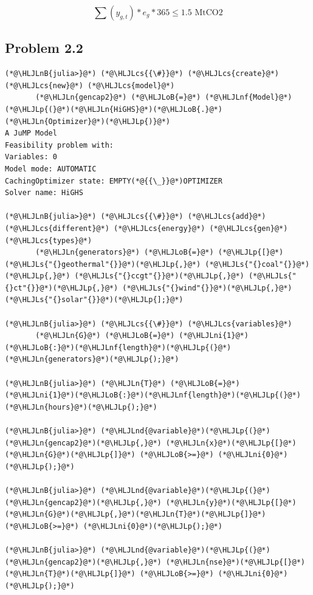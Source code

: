 \documentclass[12pt,a4paper]{article}
\newcommand{\HLJLn}[1]{#1}
\newcommand{\HLJLnd}[1]{\textcolor[RGB]{214,102,97}{#1}}
\newcommand{\HLJLnf}[1]{\textcolor[RGB]{66,102,213}{#1}}
\newcommand{\HLJLs}[1]{\textcolor[RGB]{201,61,57}{#1}}
\newcommand{\HLJLnB}[1]{\textcolor[RGB]{59,151,46}{#1}}
\newcommand{\HLJLni}[1]{\textcolor[RGB]{59,151,46}{#1}}
\newcommand{\HLJLoB}[1]{\textcolor[RGB]{102,102,102}{\textbf{#1}}}
\newcommand{\HLJLp}[1]{#1}
\newcommand{\HLJLcs}[1]{\textcolor[RGB]{153,153,119}{\textit{#1}}}
\begin{document}
\[

\sum (y_{g,t}) * e_g * 365 \leq 1.5 \text{ MtCO2}

\]
\subsection{Problem 2.2}

\begin{lstlisting}
(*@\HLJLnB{julia>}@*) (*@\HLJLcs{{\#}}@*) (*@\HLJLcs{create}@*) (*@\HLJLcs{new}@*) (*@\HLJLcs{model}@*)
       (*@\HLJLn{gencap2}@*) (*@\HLJLoB{=}@*) (*@\HLJLnf{Model}@*)(*@\HLJLp{(}@*)(*@\HLJLn{HiGHS}@*)(*@\HLJLoB{.}@*)(*@\HLJLn{Optimizer}@*)(*@\HLJLp{)}@*)
A JuMP Model
Feasibility problem with:
Variables: 0
Model mode: AUTOMATIC
CachingOptimizer state: EMPTY(*@{{\_}}@*)OPTIMIZER
Solver name: HiGHS

(*@\HLJLnB{julia>}@*) (*@\HLJLcs{{\#}}@*) (*@\HLJLcs{add}@*) (*@\HLJLcs{different}@*) (*@\HLJLcs{energy}@*) (*@\HLJLcs{gen}@*) (*@\HLJLcs{types}@*)
       (*@\HLJLn{generators}@*) (*@\HLJLoB{=}@*) (*@\HLJLp{[}@*)(*@\HLJLs{"{}geothermal"{}}@*)(*@\HLJLp{,}@*) (*@\HLJLs{"{}coal"{}}@*)(*@\HLJLp{,}@*) (*@\HLJLs{"{}ccgt"{}}@*)(*@\HLJLp{,}@*) (*@\HLJLs{"{}ct"{}}@*)(*@\HLJLp{,}@*) (*@\HLJLs{"{}wind"{}}@*)(*@\HLJLp{,}@*) (*@\HLJLs{"{}solar"{}}@*)(*@\HLJLp{];}@*)

(*@\HLJLnB{julia>}@*) (*@\HLJLcs{{\#}}@*) (*@\HLJLcs{variables}@*)
       (*@\HLJLn{G}@*) (*@\HLJLoB{=}@*) (*@\HLJLni{1}@*)(*@\HLJLoB{:}@*)(*@\HLJLnf{length}@*)(*@\HLJLp{(}@*)(*@\HLJLn{generators}@*)(*@\HLJLp{);}@*)

(*@\HLJLnB{julia>}@*) (*@\HLJLn{T}@*) (*@\HLJLoB{=}@*) (*@\HLJLni{1}@*)(*@\HLJLoB{:}@*)(*@\HLJLnf{length}@*)(*@\HLJLp{(}@*)(*@\HLJLn{hours}@*)(*@\HLJLp{);}@*)

(*@\HLJLnB{julia>}@*) (*@\HLJLnd{@variable}@*)(*@\HLJLp{(}@*)(*@\HLJLn{gencap2}@*)(*@\HLJLp{,}@*) (*@\HLJLn{x}@*)(*@\HLJLp{[}@*)(*@\HLJLn{G}@*)(*@\HLJLp{]}@*) (*@\HLJLoB{>=}@*) (*@\HLJLni{0}@*)(*@\HLJLp{);}@*)

(*@\HLJLnB{julia>}@*) (*@\HLJLnd{@variable}@*)(*@\HLJLp{(}@*)(*@\HLJLn{gencap2}@*)(*@\HLJLp{,}@*) (*@\HLJLn{y}@*)(*@\HLJLp{[}@*)(*@\HLJLn{G}@*)(*@\HLJLp{,}@*)(*@\HLJLn{T}@*)(*@\HLJLp{]}@*) (*@\HLJLoB{>=}@*) (*@\HLJLni{0}@*)(*@\HLJLp{);}@*)

(*@\HLJLnB{julia>}@*) (*@\HLJLnd{@variable}@*)(*@\HLJLp{(}@*)(*@\HLJLn{gencap2}@*)(*@\HLJLp{,}@*) (*@\HLJLn{nse}@*)(*@\HLJLp{[}@*)(*@\HLJLn{T}@*)(*@\HLJLp{]}@*) (*@\HLJLoB{>=}@*) (*@\HLJLni{0}@*)(*@\HLJLp{);}@*)


\end{lstlisting}
\end{document}
